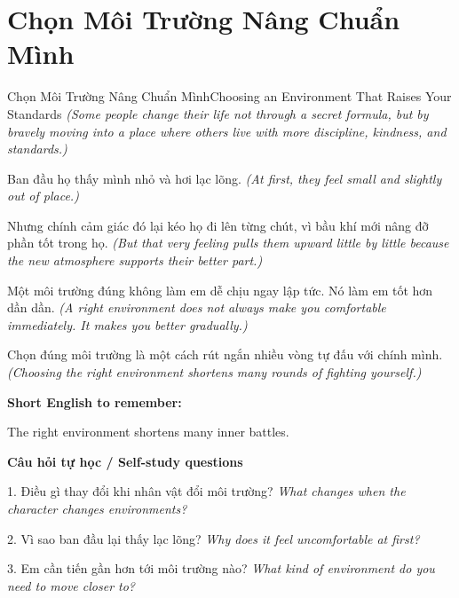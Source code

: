 \section{Chọn Môi Trường Nâng Chuẩn Mình}
\begin{truyen}{Chọn Môi Trường Nâng Chuẩn Mình}{Choosing an Environment That Raises Your Standards}
\textit{(Some people change their life not through a secret formula, but by bravely moving into a place where others live with more discipline, kindness, and standards.)}

Ban đầu họ thấy mình nhỏ và hơi lạc lõng.
\textit{(At first, they feel small and slightly out of place.)}

Nhưng chính cảm giác đó lại kéo họ đi lên từng chút, vì bầu khí mới nâng đỡ phần tốt trong họ.
\textit{(But that very feeling pulls them upward little by little because the new atmosphere supports their better part.)}

Một môi trường đúng không làm em dễ chịu ngay lập tức. Nó làm em tốt hơn dần dần.
\textit{(A right environment does not always make you comfortable immediately. It makes you better gradually.)}

\end{truyen}

\begin{baihoc}
Chọn đúng môi trường là một cách rút ngắn nhiều vòng tự đấu với chính mình.
\textit{(Choosing the right environment shortens many rounds of fighting yourself.)}
\end{baihoc}

\begin{ghinhoanh}
\textbf{Short English to remember:}

The right environment shortens many inner battles.

\end{ghinhoanh}

\begin{tuhocnhanh}
\textbf{Câu hỏi tự học / Self-study questions}

1. Điều gì thay đổi khi nhân vật đổi môi trường? \textit{What changes when the character changes environments?}

2. Vì sao ban đầu lại thấy lạc lõng? \textit{Why does it feel uncomfortable at first?}

3. Em cần tiến gần hơn tới môi trường nào? \textit{What kind of environment do you need to move closer to?}
\end{tuhocnhanh}

